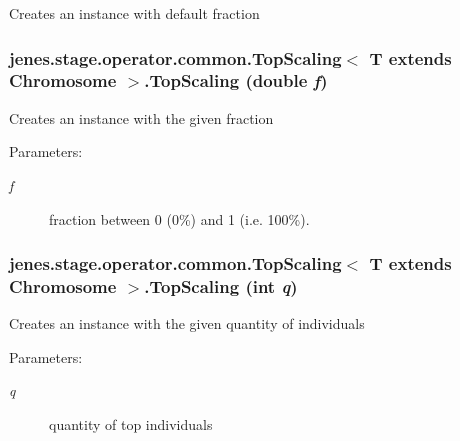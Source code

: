Creates an instance with default fraction \hypertarget{classjenes_1_1stage_1_1operator_1_1common_1_1_top_scaling_3_01_t_01extends_01_chromosome_01_4_cb9c77ba5c63f60dcb5d27cf256c6d61}{
\subsubsection[TopScaling]{\setlength{\rightskip}{0pt plus 5cm}jenes.stage.operator.common.TopScaling$<$ T extends Chromosome $>$.TopScaling (double {\em f})}}
\label{classjenes_1_1stage_1_1operator_1_1common_1_1_top_scaling_3_01_t_01extends_01_chromosome_01_4_cb9c77ba5c63f60dcb5d27cf256c6d61}


Creates an instance with the given fraction

\begin{Desc}
\item[Parameters:]
\begin{description}
\item[{\em f}]fraction between 0 (0\%) and 1 (i.e. 100\%). \end{description}
\end{Desc}
\hypertarget{classjenes_1_1stage_1_1operator_1_1common_1_1_top_scaling_3_01_t_01extends_01_chromosome_01_4_db3a002d09932e82a52f848cd4b8247e}{
\subsubsection[TopScaling]{\setlength{\rightskip}{0pt plus 5cm}jenes.stage.operator.common.TopScaling$<$ T extends Chromosome $>$.TopScaling (int {\em q})}}
\label{classjenes_1_1stage_1_1operator_1_1common_1_1_top_scaling_3_01_t_01extends_01_chromosome_01_4_db3a002d09932e82a52f848cd4b8247e}


Creates an instance with the given quantity of individuals 

\begin{Desc}
\item[Parameters:]
\begin{description}
\item[{\em q}]quantity of top individuals \end{description}
\end{Desc}


